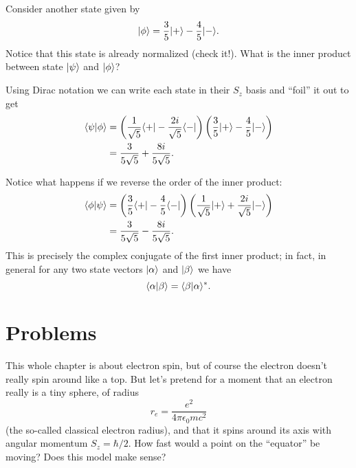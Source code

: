 \begin{example}  Consider another state given by
\begin{equation}
| \phi \rangle = \frac{3}{5} | + \rangle - \frac{4}{5} | - \rangle.
\end{equation}
Notice that this state is already normalized (check it!).  What is the inner product between state $| \psi \rangle$ and $| \phi \rangle$?

Using Dirac notation we can write each state in their $S_z$ basis and ``foil'' it out to get
\begin{align*}
\langle \psi | \phi \rangle & =  \left( \frac{1}{\sqrt{5}}\langle + | - \frac{2i}{\sqrt{5}} \langle - | \right) \left(\frac{3}{5} | + \rangle - \frac{4}{5} | - \rangle \right) \\
& = \frac{3}{5\sqrt{5}} + \frac{8i}{5\sqrt{5}}.
\end{align*}

Notice what happens if we reverse the order of the inner product:
\begin{align*}
\langle \phi | \psi \rangle & =   \left(\frac{3}{5} \langle + | - \frac{4}{5} \langle - | \right) \left( \frac{1}{\sqrt{5}}| + \rangle + \frac{2i}{\sqrt{5}} | - \rangle \right) \\
& = \frac{3}{5\sqrt{5}} - \frac{8i}{5\sqrt{5}}.
\end{align*}
This is precisely the complex conjugate of the first inner product; in fact, in general for any two state vectors $| \alpha \rangle$ and $| \beta \rangle$ we have
\begin{equation}
\langle \alpha | \beta \rangle = \langle \beta | \alpha \rangle^*.
\end{equation}
\end{example}

\section*{Problems}
%

\begin{problem}
This whole chapter is about electron spin, but of course the electron doesn't really spin around like a top.  But let's pretend for a moment that an electron really is a tiny sphere, of radius
\[
r_e = \frac{e^2}{4\pi \epsilon_0 mc^2}
\]
(the so-called classical electron radius), and that it spins around its axis with angular momentum $S_z = \hbar/2$.  How fast would a point on the ``equator'' be moving?  Does this model make sense? 
\end{problem}

